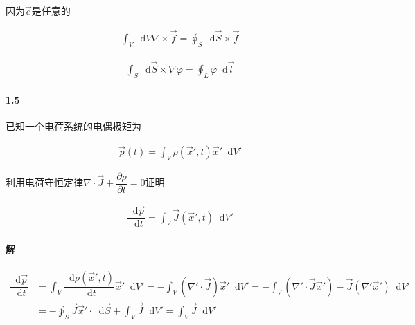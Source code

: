 \documentclass{article}
\newcommand*{\md}{\mathop{}\!\mathrm{d}}
\newcommand*{\Jmath}{J}
\begin{document}
因为$\vec{c}$是任意的

\begin{equation*}
  \begin{aligned}
    \int_V \md V \nabla \times \vec{f} = \oint_S \md \vec{S} \times \vec{f} 
  \end{aligned}
\end{equation*}

\begin{equation*}
  \begin{aligned}
    \int_S \md \vec{S} \times \nabla \varphi = \oint_L \varphi \md \vec{l}
  \end{aligned}
\end{equation*}

\paragraph{1.5}

已知一个电荷系统的电偶极矩为

\begin{equation*}
  \begin{aligned}
    \vec{p} \left( t \right) = \int_V \rho \left( \vec{x}', t \right) \vec{x}' \md V'
  \end{aligned}
\end{equation*}

利用电荷守恒定律$\nabla \cdot \vec{\Jmath} + \dfrac{\partial \rho}{\partial t} = 0 $证明

\begin{equation*}
  \begin{aligned}
    \dfrac{\md \vec{p}}{\md t} = \int_V \vec{\Jmath} \left( \vec{x}', t \right) \md V' 
  \end{aligned}
\end{equation*}

\paragraph{解}

\begin{equation*}
  \begin{aligned}
    \dfrac{\md \vec{p}}{\md t} &= \int_V \dfrac{\md \rho \left( \vec{x}', t \right) }{\md t} \vec{x}' \md V' = - \int_V \left( \nabla' \cdot \vec{\Jmath} \right) \vec{x}' \md V' = - \int_V \left( \nabla' \cdot \vec{\Jmath} \vec{x}' \right) - \vec{\Jmath} \left( \nabla' \vec{x}' \right) \md V' \\
    &= - \oint_S \vec{\Jmath} \vec{x}' \cdot \md \vec{S} + \int_V \vec{\Jmath} \md V' = \int_V \vec{\Jmath} \md V'
  \end{aligned}
\end{equation*}
\end{document}
